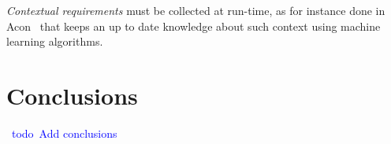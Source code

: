 \documentclass[sigconf,review, anonymous]{acmart}
\newcommand{\todo}[1]{\textcolor{blue}{\ding{46}~{\sf todo}~#1}}
\begin{document}

\emph{Contextual requirements} must be collected at run-time, as for instance done in Acon~\cite{Knauss:2016ce} that keeps an up to date knowledge about such context using machine learning algorithms.


\section{Conclusions}\label{sec:conclusions}

\todo{Add conclusions}

\balance



\end{document}
